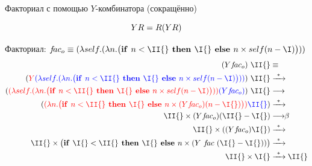 \begin{frame}{Факториал с помощью $Y$-комбинатора (сокращённо)}
\def\Yfac{\ensuremath{\app{\Y}{f\!ac_o}}}
\vspace{-1.6em}

\newcommand{\FAC}{\ensuremath{\lam{\self}{\lam{n}{ \ite{n<\II{}}{\I{}}{n \times \self(n-\I)}}}}}
\[
Y R = R (Y R)
\]


Факториал: $f\!ac_o \equiv \FAC$\\

\begin{align*}
  \Yfac\ \II{} & \equiv \\
  \redex{\Y}{\FAC}\ \II{} & \arrmany\\
  \redex{\FAC}{\Yfac}\ \II{}  & \longrightarrow\\
  \redex{(\lambda n . \ite{n<\II{} }{\I{}}{n \times \Yfac (n-\I{})})}{\II{} } & \arrmany \\
  \II{}  \times \Yfac (\II{} - \I{}) & \betaarr \\
  \II{}  \times (\Yfac \I{}) & \arrmany \\
  \II{}  \times \ite{\I{}<\II{}}{\I{}}{n \times (\Y\ f\!ac\ (\I{}-\I{}))} & \arrmany \\
  \II{}  \times \I{} & \arrmany \II{}
\end{align*}
 \end{frame}


